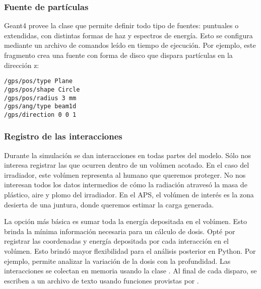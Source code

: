\subsubsection{Fuente de partículas}
Geant4 provee la clase 
que permite definir todo tipo de fuentes:
puntuales o extendidas, con distintas formas de haz y espectros de energía.
Esto se configura mediante un archivo de comandos 
leído en tiempo de ejecución.
Por ejemplo, este fragmento crea una fuente 
con forma de disco que dispara partículas en la dirección z:
\begin{verbatim}
/gps/pos/type Plane
/gps/pos/shape Circle
/gps/pos/radius 3 mm
/gps/ang/type beam1d
/gps/direction 0 0 1
\end{verbatim}
\subsubsection{Registro de las interacciones}
Durante la simulación se dan interacciones en todas partes del modelo.
Sólo nos interesa registrar las que ocurren dentro de un volúmen acotado.
En el caso del irradiador, este volúmen representa al humano que queremos
proteger.
No nos interesan todos los datos intermedios de cómo la radiación atravesó 
la masa de plástico, aire y plomo del irradiador. 
En el APS, el volúmen de interés es la zona desierta de una juntura, 
donde queremos estimar la carga generada.

La opción más básica es sumar toda la energía depositada en el volúmen.
Esto brinda la mínima información necesaria para un cálculo de dosis.
Opté por registrar las coordenadas y energía depositada
por cada interacción en el volúmen.
Esto brindó mayor flexibilidad para el análisis posterior en Python.
Por ejemplo, permite analizar la variación de la dosis con la profundidad.
Las interacciones se colectan en memoria usando la clase .
Al final de cada disparo, se escriben a un archivo de texto
usando funciones provistas por .
